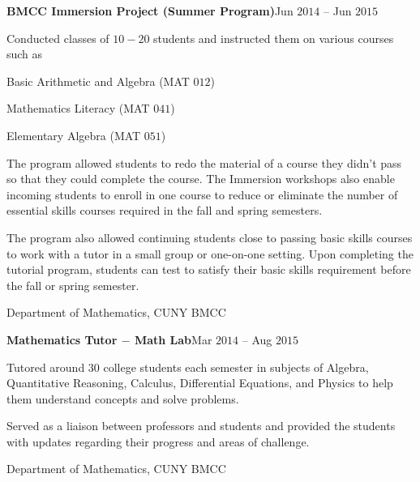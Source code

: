 \documentclass[a4paper, 12pt]{article}
\begin{document}
\begin{flushleft}
\begin{flushleft}
\textbf{BMCC Immersion Project (Summer Program)}\hfill Jun $2014$ -- Jun $2015$\\
\begin{compactitem}
    \item Conducted classes of $10 - 20$ students and instructed them on various courses such as
    \begin{compactitem}
        \item Basic Arithmetic and Algebra (MAT $012$)
        \item Mathematics Literacy (MAT $041$)
        \item Elementary Algebra (MAT $051$)
    \end{compactitem}
    
    \item The program allowed students to redo the material of a course they didn't pass so that they could complete the course. The Immersion workshops also enable incoming students to enroll in one course to reduce or eliminate the number of essential skills courses required in the fall and spring semesters.
    \item The program also allowed continuing students close to passing basic skills courses to work with a tutor in a small group or one-on-one setting. Upon completing the tutorial program, students can test to satisfy their basic skills requirement before the fall or spring semester.
\end{compactitem}
Department of Mathematics, CUNY BMCC
\end{flushleft}

\begin{flushleft}
\textbf{Mathematics Tutor $-$ Math Lab}\hfill Mar $2014$ -- Aug $2015$\\
\begin{compactitem}
    \item Tutored around $30$ college students each semester in subjects of Algebra, Quantitative Reasoning, Calculus, Differential Equations, and Physics to help them understand concepts and solve problems.
    \item Served as a liaison between professors and students and provided the students with updates regarding their progress and areas of challenge.
\end{compactitem}
Department of Mathematics, CUNY BMCC
\end{flushleft}
\end{flushleft}
\end{document}

